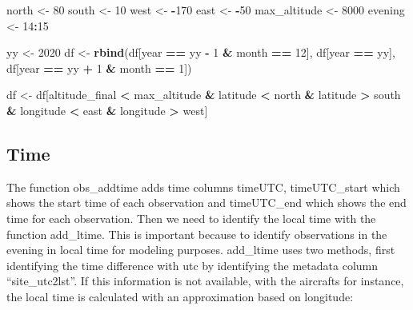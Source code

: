\documentclass[preprint, 3p,
authoryear]{elsarticle} %
\newenvironment{Shaded}{\begin{snugshade}}{\end{snugshade}}
\newcommand{\DecValTok}[1]{\textcolor[rgb]{0.00,0.00,0.81}{#1}}
\newcommand{\FunctionTok}[1]{\textcolor[rgb]{0.13,0.29,0.53}{\textbf{#1}}}
\newcommand{\NormalTok}[1]{#1}
\newcommand{\OtherTok}[1]{\textcolor[rgb]{0.56,0.35,0.01}{#1}}
\newcommand{\SpecialCharTok}[1]{\textcolor[rgb]{0.81,0.36,0.00}{\textbf{#1}}}
\begin{document}
\begin{Shaded}
\begin{Highlighting}[]
\NormalTok{north }\OtherTok{\textless{}{-}} \DecValTok{80}
\NormalTok{south }\OtherTok{\textless{}{-}} \DecValTok{10}
\NormalTok{west }\OtherTok{\textless{}{-}} \SpecialCharTok{{-}}\DecValTok{170}
\NormalTok{east }\OtherTok{\textless{}{-}} \SpecialCharTok{{-}}\DecValTok{50}
\NormalTok{max\_altitude }\OtherTok{\textless{}{-}} \DecValTok{8000}
\NormalTok{evening }\OtherTok{\textless{}{-}} \DecValTok{14}\SpecialCharTok{:}\DecValTok{15}

\NormalTok{yy }\OtherTok{\textless{}{-}} \DecValTok{2020}
\NormalTok{df }\OtherTok{\textless{}{-}} \FunctionTok{rbind}\NormalTok{(df[year }\SpecialCharTok{==}\NormalTok{ yy }\SpecialCharTok{{-}} \DecValTok{1} \SpecialCharTok{\&}\NormalTok{ month }\SpecialCharTok{==} \DecValTok{12}\NormalTok{],}
\NormalTok{            df[year }\SpecialCharTok{==}\NormalTok{ yy],}
\NormalTok{            df[year }\SpecialCharTok{==}\NormalTok{ yy }\SpecialCharTok{+} \DecValTok{1} \SpecialCharTok{\&}\NormalTok{ month }\SpecialCharTok{==} \DecValTok{1}\NormalTok{])}

\NormalTok{df }\OtherTok{\textless{}{-}}\NormalTok{ df[altitude\_final }\SpecialCharTok{\textless{}}\NormalTok{ max\_altitude }\SpecialCharTok{\&}
\NormalTok{           latitude }\SpecialCharTok{\textless{}}\NormalTok{ north }\SpecialCharTok{\&}
\NormalTok{           latitude }\SpecialCharTok{\textgreater{}}\NormalTok{ south }\SpecialCharTok{\&}
\NormalTok{           longitude }\SpecialCharTok{\textless{}}\NormalTok{ east }\SpecialCharTok{\&}
\NormalTok{           longitude }\SpecialCharTok{\textgreater{}}\NormalTok{ west]}
\end{Highlighting}
\end{Shaded}

\hypertarget{time}{%
\subsection{Time}\label{time}}

The function obs\_addtime adds time columns timeUTC, timeUTC\_start
which shows the start time of each observation and timeUTC\_end which
shows the end time for each observation. Then we need to identify the
local time with the function add\_ltime. This is important because to
identify observations in the evening in local time for modeling
purposes. add\_ltime uses two methods, first identifying the time
difference with utc by identifying the metadata column
``site\_utc2lst''. If this information is not available, with the
aircrafts for instance, the local time is calculated with an
approximation based on longitude:
\end{document}
